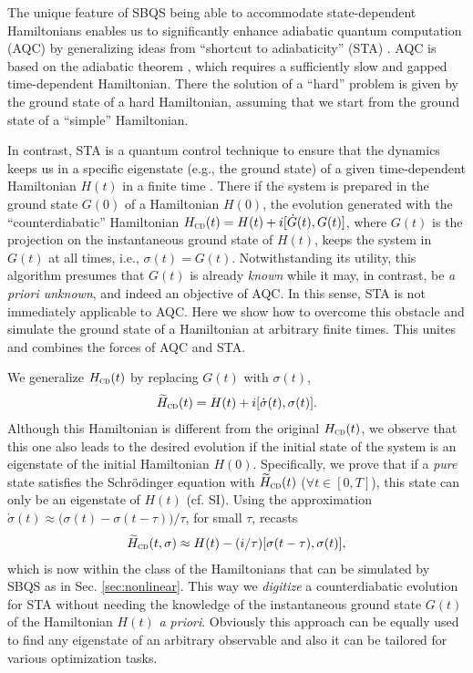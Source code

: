 \documentclass[aps,pra,twocolumn,floatfix,groupedaddress,superscriptaddress,nofootinbib,notitlepage]{revtex4-2}
\begin{document}
The unique feature of SBQS being able to accommodate state-dependent Hamiltonians enables us to significantly enhance adiabatic quantum computation (AQC) \cite{AQC} by generalizing ideas from ``shortcut to adiabaticity'' (STA) \cite{CD}. AQC is based on the adiabatic theorem \cite{exp-ad}, which requires a sufficiently slow and gapped time-dependent Hamiltonian. There the solution of a ``hard'' problem is given by the ground state of a hard Hamiltonian, assuming that we start from the ground state of a ``simple'' Hamiltonian.

In contrast, STA is a quantum control technique to ensure that the dynamics keeps us in a specific eigenstate (e.g., the ground state) of a given time-dependent Hamiltonian $H(t)$ in a finite time \cite{CD, Refael-etal}. There if the system is prepared in the ground state $G(0)$ of a Hamiltonian $H(0)$, the evolution generated with the ``counterdiabatic'' Hamiltonian $H_{\textsc{cd}}(t) = H(t) + i[\dot{G}(t), G(t)]$, where $G(t)$ is the projection on the instantaneous ground state of $H(t)$, keeps the system in $G(t)$ at all times, i.e., $\sigma(t)=G(t)$. Notwithstanding its utility, this algorithm presumes that $G(t)$ is already \textit{known} while it may, in contrast, be  \textit{a priori unknown}, and indeed an objective of AQC. In this sense, STA is not immediately applicable to AQC. Here we show how to overcome this obstacle and simulate the ground state of a Hamiltonian at arbitrary finite times. This unites and combines the forces of AQC and STA.

We generalize $H_{\textsc{cd}}(t)$ by replacing $G(t)$ with $\sigma(t)$,
\begin{align}
\widetilde{H}_{\textsc{cd}}(t) = H(t) + i[\dot{\sigma}(t), \sigma(t)].
\label{CD-Ham}
\end{align}
Although this Hamiltonian is different from the original $H_{\textsc{cd}}(t)$, we observe that this one also leads to the desired evolution if the initial state of the system is an eigenstate of the initial Hamiltonian $H(0)$. Specifically, we prove that if a \textit{pure} state satisfies the Schr\"{o}dinger equation with $\widetilde{H}_{\textsc{cd}}(t)$ ($\forall t\in[0,T]$), this state can only be an eigenstate of $H(t)$ (cf. SI). Using the approximation $\dot{\sigma}(t) \approx \big(\sigma(t)-\sigma(t-\tau)\big)/\tau$, for small $\tau$, recasts
\begin{align}
\widetilde{H}_{\textsc{cd}}(t,\sigma) \approx H(t) - (i/\tau)[\sigma(t-\tau), \sigma(t)],
\end{align}
which is now within the class of the Hamiltonians that can be simulated by SBQS as in Sec. \ref{sec:nonlinear}. This way we \textit{digitize} a counterdiabatic evolution for STA without needing the knowledge of the instantaneous ground state $G(t)$ of the Hamiltonian $H(t)$ \textit{a priori}. Obviously this approach can be equally used to find any eigenstate of an arbitrary observable and also it can be tailored for various optimization tasks.  
\end{document}
